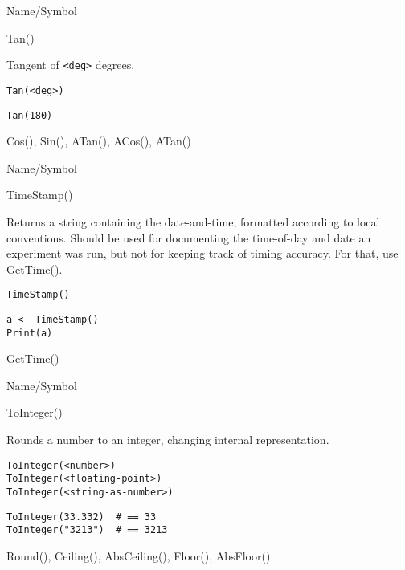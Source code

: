 \begin{desc}{Name/Symbol}
\item[Name/Symbol]  	Tan()	

\item[Description] 	Tangent of \verb+<deg>+ degrees.

\item[Usage]       	
\begin{verbatim}
Tan(<deg>)
\end{verbatim}

\item[Example]
\begin{verbatim}
Tan(180)
\end{verbatim}

\item[See Also]    	Cos(), Sin(), ATan(), ACos(), ATan() 
\end{desc}

\rl


\begin{desc}{Name/Symbol}
\item[Name/Symbol]  	TimeStamp()

\item[Description]  	Returns a string containing the date-and-time, formatted
	     	according to local conventions. Should be used for
	     	documenting the time-of-day and date an experiment was
	     	run, but not for keeping track of timing accuracy.  For
	     	that, use GetTime().
	     
\item[Usage]
\begin{verbatim}
TimeStamp()
\end{verbatim}

\item[Example]
\begin{verbatim}
a <- TimeStamp()
Print(a)
\end{verbatim}

\item[See Also]     	GetTime()
\end{desc}

\rl


\begin{desc}{Name/Symbol}
\item[Name/Symbol]  	ToInteger()
              
\item[Description]  	Rounds a number to an integer, changing internal 
		representation.

\item[Usage]
\begin{verbatim}
ToInteger(<number>)
ToInteger(<floating-point>)
ToInteger(<string-as-number>)
\end{verbatim}

\item[Example]
\begin{verbatim}
ToInteger(33.332)  # == 33
ToInteger("3213")  # == 3213
\end{verbatim}

\item[See Also]    	Round(), Ceiling(), AbsCeiling(), Floor(), AbsFloor()
\end{desc}

